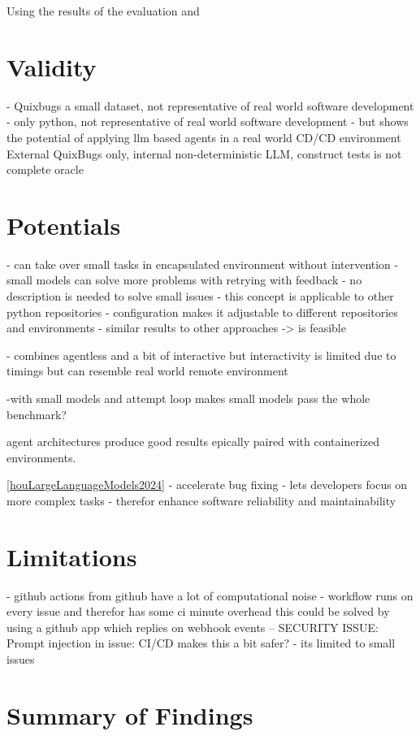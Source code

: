 Using the results of the evaluation and 

\section{Validity}

- Quixbugs a small dataset, not representative of real world software development
- only python, not representative of real world software development
- but shows the potential of applying llm based agents in a real world CD/CD environment
External QuixBugs only, internal non-deterministic LLM, construct tests is not complete oracle

\section{Potentials}
- can take over small tasks in encapsulated environment without intervention
- small models can solve more problems with retrying with feedback
- no description is needed to solve small issues
- this concept is applicable to other python repositories
- configuration makes it adjustable to different repositories and environments
- similar results to other approaches -> is feasible

- combines agentless and a bit of interactive but interactivity is limited due to timings but can resemble real world remote environment

-with small models and attempt loop makes small models pass the whole benchmark?

agent architectures produce good results epically paired with containerized environments. \cite{puvvadiCodingAgentsComprehensive2025}

\ref{houLargeLanguageModels2024}
- accelerate bug fixing
- lets developers focus on more complex tasks
- therefor enhance software reliability and maintainability

\section{Limitations}
- github actions from github have a lot of computational noise
- workflow runs on every issue and therefor has some ci minute overhead this could be solved by using a github app which replies on webhook events
-- SECURITY ISSUE: Prompt injection in issue: CI/CD makes this a bit safer?
- its limited to small issues

\section{Summary of Findings}

